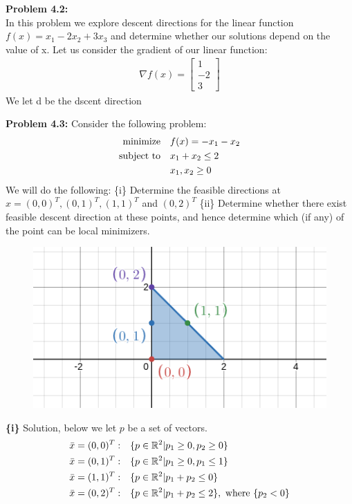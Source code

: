 \documentclass{article}
\begin{document}
 
\pagestyle{fancy}

\textbf{Problem 4.2:} \\
In this problem we explore descent directions for the linear function $f(x) = x_1 - 2x_2 + 3x_3$ and determine whether our solutions depend on the value of x. Let us consider the gradient of our linear function:
\begin{align*}
    \nabla f(x) = \begin{bmatrix} 1 \\ -2 \\ 3 \end{bmatrix}
\end{align*}
We let d be the dscent direction

\textbf{Problem 4.3:} Consider the following problem: 
\begin{align*}
    \text{minimize} &\null \quad f(x) = -x_1 - x_2 \\ 
    \text{subject to} &\null \quad x_1 + x_2 \leq 2 \\
     &\null \quad x_1, x_2 \geq 0
\end{align*}
We will do the following: \newline \setlength\parindent{24pt}  
\indent \{i\} Determine the feasible directions at  $x = (0,0)^T, (0,1)^T, (1,1)^T$ and $(0,2)^T$ \newline 
\indent \{ii\} Determine whether there exist feasible descent direction at these points, and hence determine which (if any) of the point can be local minimizers. 
\newline 
\begin{figure}[H]
    \centering
    \includegraphics[scale = 0.40]{desmos2.png}
\end{figure}
\indent \textbf{\{i\}} Solution, below we let $p$ be a set of vectors.
\begin{align*}
    \bar{x} = (0,0)^T: &\null \quad \{p \in \mathbb{R}^2 | p_1 \geq 0, p_2 \geq 0 \} \\
    \bar{x} = (0,1)^T: &\null \quad \{p \in \mathbb{R}^2 | p_1 \geq 0, p_1 \leq 1 \} \\
    \bar{x} = (1,1)^T: &\null \quad \{p \in \mathbb{R}^2 | p_1 + p_2 \leq 0 \} \\
    \bar{x} = (0,2)^T: &\null \quad \{p \in \mathbb{R}^2 | p_1 + p_2 \leq 2 \}, \text{ where } \{p_2 < 0\}\\
\end{align*}
\end{document}
